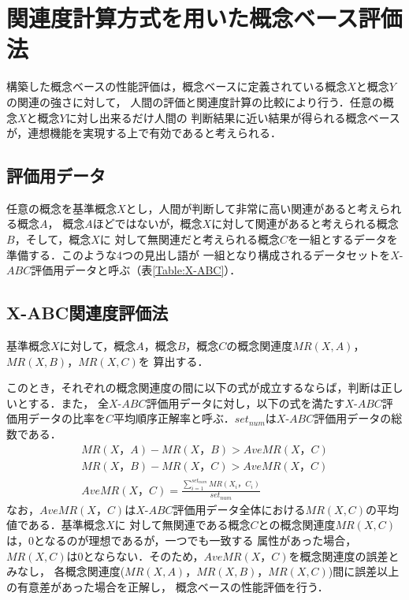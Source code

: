 \documentclass[japanese]{jnlp_1.3e}
\begin{document}
\section{関連度計算方式を用いた概念ベース評価法} \label{hyouka}

構築した概念ベースの性能評価は，概念ベースに定義されている概念$X$と概念$Y$の関連の強さに対して，
人間の評価と関連度計算の比較により行う．任意の概念$X$と概念$Y$に対し出来るだけ人間の
判断結果に近い結果が得られる概念ベースが，連想機能を実現する上で有効であると考えられる．



\subsection{評価用データ}

任意の概念を基準概念$X$とし，人間が判断して非常に高い関連があると考えられる概念$A$，
概念$A$ほどではないが，概念$X$に対して関連があると考えられる概念$B$，そして，概念$X$に
対して無関連だと考えられる概念$C$を一組とするデータを準備する．このような4つの見出し語が
一組となり構成されるデータセットを$X$-$\mathit{ABC}$評価用データと呼ぶ（表\ref{Table:X-ABC}）．

\begin{table}[t]

\end{table}



\subsection{X-ABC関連度評価法}

基準概念$X$に対して，概念$A$，概念$B$，概念$C$の概念関連度$\mathit{MR}(X,A)$，$\mathit{MR}(X,B)$，$\mathit{MR}(X,C)$を
算出する．

このとき，それぞれの概念関連度の間に以下の式が成立するならば，判断は正しいとする．また，
全$X$-$\mathit{ABC}$評価用データに対し，以下の式を満たす$X$-$\mathit{ABC}$評価用データの比率を$C$平均順序正解率と呼ぶ．$set_{num}$は$X$-$\mathit{ABC}$評価用データの総数である．
\begin{gather}
\mathit{MR}(X，A) - \mathit{MR}(X，B) > \mathit{AveMR}(X，C) \\
\mathit{MR}(X，B) - \mathit{MR}(X，C) > \mathit{AveMR}(X，C) \\
\mathit{AveMR}(X，C) = \frac{\sum_{i=1}^{\mathit{set}_{\mathit{num}}}\mathit{MR}(X_i，C_i)}{\mathit{set}_{\mathit{num}}}
\end{gather}
なお，$\mathit{AveMR}(X，C)$は$X$-$\mathit{ABC}$評価用データ全体における$MR(X,C)$の平均値である．基準概念$X$に
対して無関連である概念$C$との概念関連度$\mathit{MR}(X,C)$は，0となるのが理想であるが，一つでも一致する
属性があった場合，$\mathit{MR}(X,C)$は$0$とならない．そのため，$\mathit{AveMR}(X，C)$を概念関連度の誤差とみなし，
各概念関連度($\mathit{MR}(X,A)$，$\mathit{MR}(X,B)$，$\mathit{MR}(X,C)$)間に誤差以上の有意差があった場合を正解し，
概念ベースの性能評価を行う．
\end{document}
